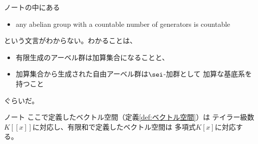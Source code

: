 	\begin{note}[加算な生成系を持つアーベル群]
	\label{note:加算な生成系を持つアーベル群} %
		ノート\cite{schroeer.baer}の中にある
		\begin{itemize}\setlength{\itemsep}{-1mm} %
			\item any abelian group with a countable number of generators is countable
		\end{itemize} %
		という文言がわからない。わかることは、
		\begin{itemize}\setlength{\itemsep}{-1mm} %
			\item 有限生成のアーベル群は加算集合になることと、
			\item 加算集合から生成された自由アーベル群は$\sei$-加群として
			加算な基底系を持つこと
		\end{itemize} %
		ぐらいだ。
	\end{note} %

	\begin{todo}[基底を持たないベクトル空間]
	\label{todo:基底を持たないベクトル空間} %
		ノート\cite{schroeer.baer}
		ここで定義したベクトル空間（定義\ref{def:ベクトル空間}）は
		テイラー級数$K[[x]]$に対応し、有限和で定義したベクトル空間は
		多項式$K[x]$に対応する。
	\end{todo} %


